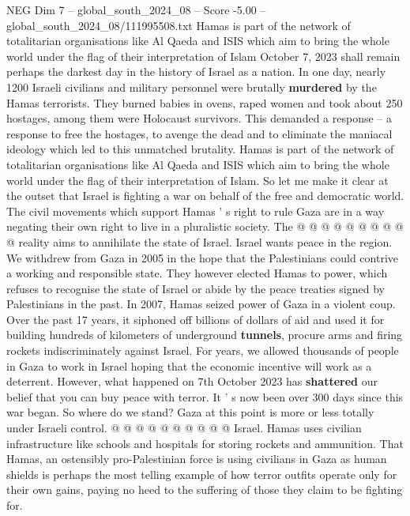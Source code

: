 \begin{textsample}{NEG Dim 7 – global\_south\_2024\_08 – Score -5.00 – global\_south\_2024\_08/111995508.txt}  \label{ex:f7_neg_372}
Hamas is part of the network of totalitarian organisations like Al Qaeda and ISIS which aim to bring the whole world under the flag of their interpretation of Islam October 7, 2023 shall remain perhaps the darkest day in the history of Israel as a nation.
In one day, nearly 1200 Israeli civilians and military personnel were brutally \textbf{murdered} by the Hamas terrorists.
They burned babies in ovens, raped women and took about 250 hostages, among them were Holocaust survivors.
This demanded a response -- a response to free the hostages, to avenge the dead and to eliminate the maniacal ideology which led to this unmatched brutality.
Hamas is part of the network of totalitarian organisations like Al Qaeda and ISIS which aim to bring the whole world under the flag of their interpretation of Islam.
So let me make it clear at the outset that Israel is fighting a war on behalf of the free and democratic world.
The civil movements which support Hamas ' s right to rule Gaza are in a way negating their own right to live in a pluralistic society.
The @ @ @ @ @ @ @ @ @ @ reality aims to annihilate the state of Israel.
Israel wants peace in the region.
We withdrew from Gaza in 2005 in the hope that the Palestinians could contrive a working and responsible state.
They however elected Hamas to power, which refuses to recognise the state of Israel or abide by the peace treaties signed by Palestinians in the past.
In 2007, Hamas seized power of Gaza in a violent coup.
Over the past 17 years, it siphoned off billions of dollars of aid and used it for building hundreds of kilometers of underground \textbf{tunnels}, procure arms and firing rockets indiscriminately against Israel.
For years, we allowed thousands of people in Gaza to work in Israel hoping that the economic incentive will work as a deterrent.
However, what happened on 7th October 2023 has \textbf{shattered} our belief that you can buy peace with terror.
It ' s now been over 300 days since this war began.
So where do we stand?
Gaza at this point is more or less totally under Israeli control. @ @ @ @ @ @ @ @ @ @ Israel.
Hamas uses civilian infrastructure like schools and hospitals for storing rockets and ammunition.
That Hamas, an ostensibly pro-Palestinian force is using civilians in Gaza as human shields is perhaps the most telling example of how terror outfits operate only for their own gains, paying no heed to the suffering of those they claim to be fighting for.

\end{textsample}
